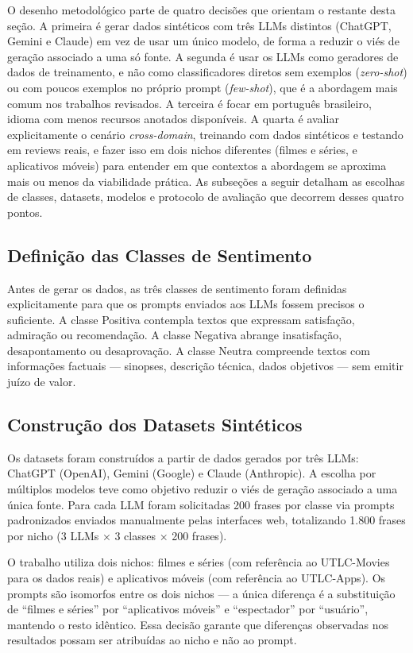 \documentclass[12pt]{article}
\begin{document}
O desenho metodológico parte de quatro decisões que orientam o restante desta seção. A primeira é gerar dados sintéticos com três LLMs distintos (ChatGPT, Gemini e Claude) em vez de usar um único modelo, de forma a reduzir o viés de geração associado a uma só fonte. A segunda é usar os LLMs como geradores de dados de treinamento, e não como classificadores diretos sem exemplos (\textit{zero-shot}) ou com poucos exemplos no próprio prompt (\textit{few-shot}), que é a abordagem mais comum nos trabalhos revisados. A terceira é focar em português brasileiro, idioma com menos recursos anotados disponíveis. A quarta é avaliar explicitamente o cenário \textit{cross-domain}, treinando com dados sintéticos e testando em reviews reais, e fazer isso em dois nichos diferentes (filmes e séries, e aplicativos móveis) para entender em que contextos a abordagem se aproxima mais ou menos da viabilidade prática. As subseções a seguir detalham as escolhas de classes, datasets, modelos e protocolo de avaliação que decorrem desses quatro pontos.

\subsection{Definição das Classes de Sentimento}

Antes de gerar os dados, as três classes de sentimento foram definidas explicitamente para que os prompts enviados aos LLMs fossem precisos o suficiente. A classe Positiva contempla textos que expressam satisfação, admiração ou recomendação. A classe Negativa abrange insatisfação, desapontamento ou desaprovação. A classe Neutra compreende textos com informações factuais — sinopses, descrição técnica, dados objetivos — sem emitir juízo de valor.

\subsection{Construção dos Datasets Sintéticos}

Os datasets foram construídos a partir de dados gerados por três LLMs: ChatGPT (OpenAI), Gemini (Google) e Claude (Anthropic). A escolha por múltiplos modelos teve como objetivo reduzir o viés de geração associado a uma única fonte. Para cada LLM foram solicitadas 200 frases por classe via prompts padronizados enviados manualmente pelas interfaces web, totalizando 1.800 frases por nicho (3 LLMs × 3 classes × 200 frases).

O trabalho utiliza dois nichos: filmes e séries (com referência ao UTLC-Movies para os dados reais) e aplicativos móveis (com referência ao UTLC-Apps). Os prompts são isomorfos entre os dois nichos — a única diferença é a substituição de ``filmes e séries'' por ``aplicativos móveis'' e ``espectador'' por ``usuário'', mantendo o resto idêntico. Essa decisão garante que diferenças observadas nos resultados possam ser atribuídas ao nicho e não ao prompt.
\end{document}
